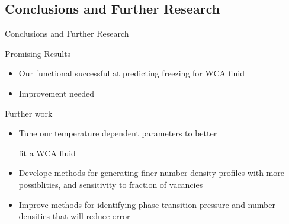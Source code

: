\documentclass{beamer}
\begin{document}
\subsection*{Conclusions and Further Research}
\begin{frame}{Conclusions and Further Research}
          \begin{block}{Promising Results}
            \begin{itemize}
            \item Our functional successful at predicting freezing for WCA fluid
            \item Improvement needed
            \end{itemize}
          \end{block}
          \begin{block}{Further work}
            \begin{itemize}
            \item Tune our temperature dependent parameters to better 
            
            fit a WCA fluid
            \item Develope methods for generating finer number density 
            profiles with more possiblities, and sensitivity to fraction of vacancies
            \item Improve methods for identifying phase transition 
            pressure and number densities that will reduce error
            \end{itemize}
          \end{block}
\end{frame}
\end{document}
